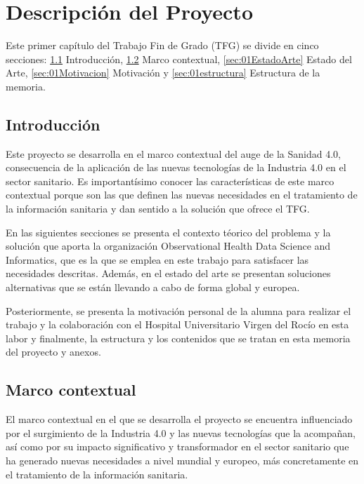 \chapter{Descripción del Proyecto}\label{cap:01introduccion}

Este primer capítulo del Trabajo Fin de Grado (TFG) se divide en cinco secciones: \ref{sec:01intro} Introducción, \ref{sec:01Contexto} Marco contextual, \ref{sec:01EstadoArte} Estado del Arte, \ref{sec:01Motivacion} Motivación y \ref{sec:01estructura} Estructura de la memoria.

\section{Introducción} \label{sec:01intro}

Este proyecto se desarrolla en el marco contextual del auge de la Sanidad 4.0, consecuencia de la aplicación de las nuevas tecnologías de la Industria 4.0 en el sector sanitario. Es importantísimo conocer las características de este marco contextual porque son las que definen las nuevas necesidades en el tratamiento de la información sanitaria y dan sentido a la solución que ofrece el TFG.

En las siguientes secciones se presenta el contexto téorico del problema y la solución que aporta la organización Observational Health Data Science and Informatics, que es la que se emplea en este trabajo para satisfacer las necesidades descritas. Además, en el estado del arte se presentan soluciones alternativas que se están llevando a cabo de forma global y europea.

Posteriormente, se presenta la motivación personal de la alumna para realizar el trabajo y la colaboración con el Hospital Universitario Virgen del Rocío en esta labor y finalmente, la estructura y los contenidos que se tratan en esta memoria del proyecto y anexos.


\section{Marco contextual} \label{sec:01Contexto} 

El marco contextual en el que se desarrolla el proyecto se encuentra influenciado por el surgimiento de la Industria 4.0 y las nuevas tecnologías que la acompañan, así como por su impacto significativo y transformador en el sector sanitario que ha generado nuevas necesidades a nivel mundial y europeo, más concretamente en el tratamiento de la información sanitaria. 


